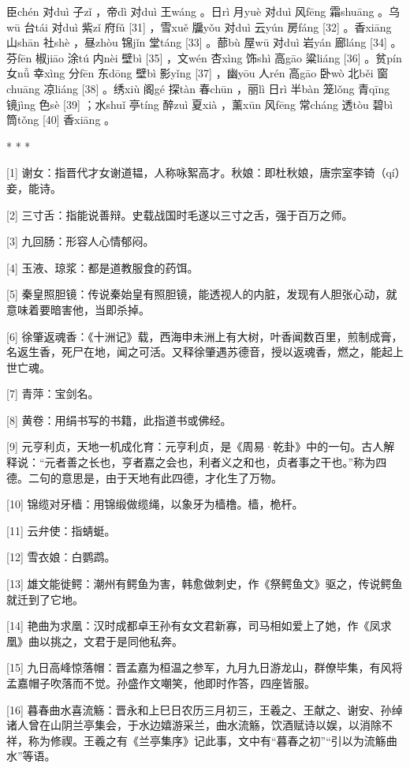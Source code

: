 \documentclass[12pt,UTF8]{ctexbook}
\begin{document}
臣chén 对duì 子zǐ ，帝dì 对duì 王wáng 。日rì 月yuè 对duì 风fēng 霜shuāng 。乌wū 台tái 对duì 紫zǐ 府fǔ [31] ，雪xuě 牖yǒu 对duì 云yún 房fáng [32] 。香xiāng 山shān 社shè ，昼zhòu 锦jǐn 堂táng [33] 。蔀bù 屋wū 对duì 岩yán 廊láng [34] 。芬fēn 椒jiāo 涂tú 内nèi 壁bì [35] ，文wén 杏xìng 饰shì 高gāo 粱liáng [36] 。贫pín 女nǚ 幸xìng 分fēn 东dōng 壁bì 影yǐng [37] ，幽yōu 人rén 高gāo 卧wò 北běi 窗chuāng 凉liáng [38] 。绣xiù 阁gé 探tàn 春chūn ，丽lì 日rì 半bàn 笼lǒng 青qīng 镜jìng 色sè [39] ；水shuǐ 亭tíng 醉zuì 夏xià ，薰xūn 风fēng 常cháng 透tòu 碧bì 筒tǒng [40] 香xiāng 。



* * *



[1] 谢女：指晋代才女谢道韫，人称咏絮高才。秋娘：即杜秋娘，唐宗室李锜（qí）妾，能诗。

[2] 三寸舌：指能说善辩。史载战国时毛遂以三寸之舌，强于百万之师。

[3] 九回肠：形容人心情郁闷。

[4] 玉液、琼浆：都是道教服食的药饵。

[5] 秦皇照胆镜：传说秦始皇有照胆镜，能透视人的内脏，发现有人胆张心动，就意味着要暗害他，当即杀掉。

[6] 徐肇返魂香：《十洲记》载，西海申未洲上有大树，叶香闻数百里，煎制成膏，名返生香，死尸在地，闻之可活。又释徐肇遇苏德音，授以返魂香，燃之，能起上世亡魂。

[7] 青萍：宝剑名。

[8] 黄卷：用绢书写的书籍，此指道书或佛经。

[9] 元亨利贞，天地一机成化育：元亨利贞，是《周易·乾卦》中的一句。古人解释说：“元者善之长也，亨者嘉之会也，利者义之和也，贞者事之干也。”称为四德。二句的意思是，由于天地有此四德，才化生了万物。

[10] 锦缆对牙樯：用锦缎做缆绳，以象牙为樯橹。樯，桅杆。

[11] 云弁使：指蜻蜓。

[12] 雪衣娘：白鹦鹉。

[13] 雄文能徙鳄：潮州有鳄鱼为害，韩愈做刺史，作《祭鳄鱼文》驱之，传说鳄鱼就迁到了它地。

[14] 艳曲为求凰：汉时成都卓王孙有女文君新寡，司马相如爱上了她，作《凤求凰》曲以挑之，文君于是同他私奔。

[15] 九日高峰惊落帽：晋孟嘉为桓温之参军，九月九日游龙山，群僚毕集，有风将孟嘉帽子吹落而不觉。孙盛作文嘲笑，他即时作答，四座皆服。

[16] 暮春曲水喜流觞：晋永和上巳日农历三月初三，王羲之、王献之、谢安、孙绰诸人曾在山阴兰亭集会，于水边嬉游采兰，曲水流觞，饮酒赋诗以娱，以消除不祥，称为修禊。王羲之有《兰亭集序》记此事，文中有“暮春之初”“引以为流觞曲水”等语。
\end{document}
